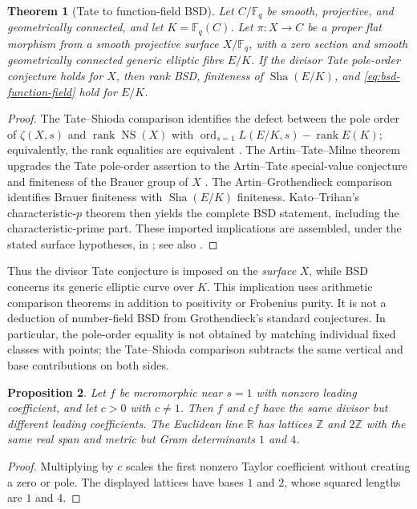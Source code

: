 \documentclass[11pt]{amsart}
\theoremstyle{plain}
\newtheorem{theorem}{Theorem}[section]
\newtheorem{proposition}[theorem]{Proposition}
\theoremstyle{definition}
\theoremstyle{remark}
\numberwithin{equation}{section}
\newcommand{\R}{\mathbb{R}}
\newcommand{\Z}{\mathbb{Z}}
\newcommand{\F}{\mathbb{F}}
\DeclareMathOperator{\ord}{ord}
\newcommand{\Sha}{\operatorname{Sha}}
\begin{document}
\begin{theorem}[Tate to function-field BSD]
\label{thm:bsd-function-field}
Let $C/\F_q$ be smooth, projective, and geometrically connected, and
let $K=\F_q(C)$. Let $\pi:X\to C$ be a proper flat morphism from a
smooth projective surface $X/\F_q$, with a zero section and smooth
geometrically
connected generic elliptic fibre $E/K$. If the divisor Tate
pole-order conjecture holds for $X$, then rank BSD, finiteness of
$\Sha(E/K)$, and \eqref{eq:bsd-function-field} hold for $E/K$.
\end{theorem}
\begin{proof}
The Tate--Shioda comparison identifies the defect between the pole
order of $\zeta(X,s)$ and $\operatorname{rank}\operatorname{NS}(X)$
with $\ord_{s=1}L(E/K,s)-\operatorname{rank}E(K)$; equivalently, the
rank equalities are equivalent
\cite[Proposition~2.4]{LichtenbaumRamachandranSuzuki2022ArtinTateBSD}.
The Artin--Tate--Milne theorem upgrades the Tate pole-order assertion
to the Artin--Tate special-value conjecture and finiteness of the
Brauer group of $X$
\cite[Theorem~6.1.4]{Ulmer2012CurvesJacobians}.
The Artin--Grothendieck comparison identifies
Brauer finiteness with $\Sha(E/K)$ finiteness. Kato--Trihan's
characteristic-$p$ theorem then yields the complete BSD statement,
including the characteristic-prime part. These imported implications
are assembled, under the stated surface hypotheses, in
\cite[Theorem~1.1 and \S1.1]%
{LichtenbaumRamachandranSuzuki2022ArtinTateBSD}; see also
\cite[p.~541]{KatoTrihan2003BSD}.
\end{proof}

Thus the divisor Tate conjecture is imposed on the \emph{surface}
$X$, while BSD concerns its generic elliptic curve over $K$.
This implication uses arithmetic comparison theorems in addition to
positivity or Frobenius purity. It is not a deduction of number-field
BSD from Grothendieck's standard conjectures. In particular, the
pole-order equality is not obtained by matching individual fixed
classes with points; the Tate--Shioda comparison subtracts the same
vertical and base contributions on both sides.

\begin{proposition}\label{prop:bsd-coefficient-gap}
Let $f$ be meromorphic near $s=1$ with nonzero leading coefficient,
and let $c>0$ with $c\ne1$. Then $f$ and $cf$ have the same divisor
but different leading coefficients. The Euclidean line $\R$ has
lattices $\Z$ and $2\Z$ with the same real span and metric but Gram
determinants $1$ and $4$.
\end{proposition}
\begin{proof}
Multiplying by $c$ scales the first nonzero Taylor coefficient
without creating a zero or pole. The displayed lattices have bases
$1$ and $2$, whose squared lengths are $1$ and $4$.
\end{proof}
\end{document}
